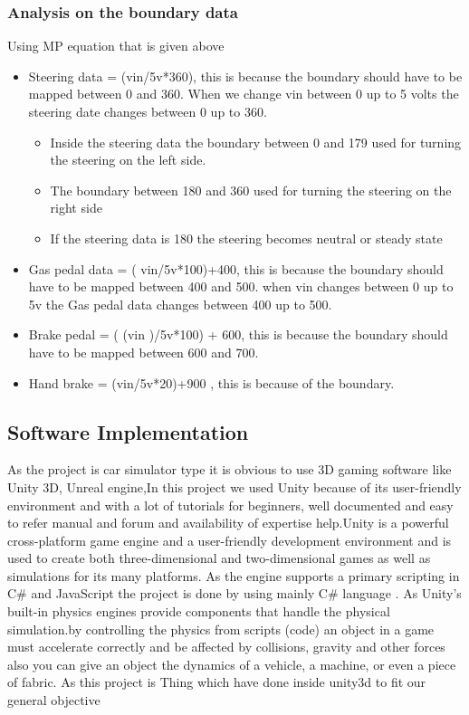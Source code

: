 \documentclass[12pt,a4paper]{article}
\begin{document}
\begin{center}
\begin{center}
\begin{center}
\subsubsection{Analysis on the boundary data}
Using MP equation that is given above
\begin{itemize}
	\item
		Steering data =  (vin/5v*360),  this is because the boundary should have to be mapped between 0 and 360. When we change vin between 0 up to 5 volts the steering date changes between 0 up to 360.
		\begin{itemize}
			\item Inside the steering data the boundary between 0 and 179 used for turning the steering on the left side.
			\item The boundary between 180 and 360 used for turning the steering on the right side
			\item If the steering data is 180 the steering becomes neutral or steady state
		\end{itemize}
	\item 
		Gas pedal data = ( vin/5v*100)+400, this is because the boundary should have to be mapped between 400 and 500. when vin changes between 0 up to 5v the Gas pedal data changes between 400 up to 500.
	\item
	Brake pedal = ( (vin )/5v*100) + 600, this is because the boundary should have to be mapped between 600 and 700.
	\item
		Hand brake = (vin/5v*20)+900 , this is because of the boundary.
	
\end{itemize}

\subsection{Software Implementation}
As the project is car simulator type it is obvious to use 3D gaming software like Unity 3D, Unreal engine,In this project we used Unity because of its user-friendly environment and with a lot of tutorials for beginners, well documented and easy to refer manual and forum and availability of expertise help.Unity is a powerful cross-platform game engine and a user-friendly development environment and is used to create both three-dimensional and two-dimensional games as well as simulations for its many platforms. As the engine supports a primary scripting in C# and JavaScript the project is done by using mainly C# language .
As Unity’s built-in physics engines provide components that handle the physical simulation.by controlling the physics from scripts (code) an object in a game must accelerate correctly and be affected by collisions, gravity and other forces also you can give an object the dynamics of a vehicle, a machine, or even a piece of fabric. As this project is
Thing which have done inside unity3d to fit our general objective

\end{center}
\end{center}
\end{center}
\end{document}
